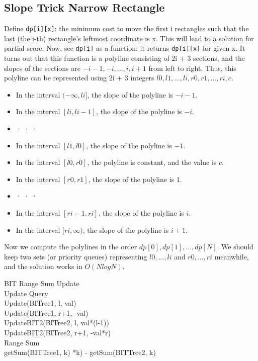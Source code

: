 \subsection{Slope Trick Narrow Rectangle}
Define \texttt{dp[i][x]}: the minimum cost to move the first i rectangles such that the last (the i-th) rectangle’s
leftmost coordinate is x. This will lead to a solution for partial score.
Now, see \texttt{dp[i]} as a function: it returns \texttt{dp[i][x]} for given x. It turns out that this function is a polyline
consisting of 2i + 3 sections, and the slopes of the sections are $ -i - 1, -i, . . . , i, i + 1 $ from left to right.
Thus, this polyline can be represented using 2i + 3 integers $l0, l1, ..., li, r0, r1, ..., ri, c$.
\begin{itemize}
	\item In the interval $(-\infty, li]$, the slope of the polyline is $-i - 1$.
	\item In the interval $[li, li-1]$, the slope of the polyline is $-i$.
	\item · · ·
	\item In the interval $[l1, l0]$, the slope of the polyline is $-1$.
	\item In the interval $[l0, r0]$, the polyline is constant, and the value is $c$.
	\item In the interval $[r0, r1]$, the slope of the polyline is $1$.
	\item · · ·
	\item In the interval $[ri-1, ri]$, the slope of the polyline is $i$.
	\item In the interval $[ri,\infty)$, the slope of the polyline is $i + 1$.
\end{itemize}

Now we compute the polylines in the order $dp[0], dp[1], . . . , dp[N]$. We should keep two sets (or priority
queues) representing ${l0,...,li}$ and ${r0,...,ri}$ meanwhile, and the solution works in $O(NlogN)$. 




BIT Range Sum Update \\ 
Update Query \\
Update(BITree1, l, val) \\ 
Update(BITree1, r+1, -val) \\ 
UpdateBIT2(BITree2, l, val*(l-1)) \\ 
UpdateBIT2(BITree2, r+1, -val*r) \\

Range Sum \\
getSum(BITTree1, k) *k) - getSum(BITTree2, k) \\ 